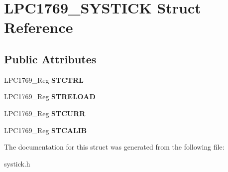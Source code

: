 \hypertarget{struct_l_p_c1769___s_y_s_t_i_c_k}{\section{L\+P\+C1769\+\_\+\+S\+Y\+S\+T\+I\+C\+K Struct Reference}
\label{struct_l_p_c1769___s_y_s_t_i_c_k}
}
\subsection*{Public Attributes}
\begin{DoxyCompactItemize}
\item 
\hypertarget{struct_l_p_c1769___s_y_s_t_i_c_k_ac19578163d340120906beb4732199f8c}{L\+P\+C1769\+\_\+\+Reg {\bfseries S\+T\+C\+T\+R\+L}}\label{struct_l_p_c1769___s_y_s_t_i_c_k_ac19578163d340120906beb4732199f8c}

\item 
\hypertarget{struct_l_p_c1769___s_y_s_t_i_c_k_a2f17969d3e20fb43ea3106ab9692cec7}{L\+P\+C1769\+\_\+\+Reg {\bfseries S\+T\+R\+E\+L\+O\+A\+D}}\label{struct_l_p_c1769___s_y_s_t_i_c_k_a2f17969d3e20fb43ea3106ab9692cec7}

\item 
\hypertarget{struct_l_p_c1769___s_y_s_t_i_c_k_a636459c239e7f4177e2c243c01941732}{L\+P\+C1769\+\_\+\+Reg {\bfseries S\+T\+C\+U\+R\+R}}\label{struct_l_p_c1769___s_y_s_t_i_c_k_a636459c239e7f4177e2c243c01941732}

\item 
\hypertarget{struct_l_p_c1769___s_y_s_t_i_c_k_a09f56937b894b0b4204868bd0b3502d9}{L\+P\+C1769\+\_\+\+Reg {\bfseries S\+T\+C\+A\+L\+I\+B}}\label{struct_l_p_c1769___s_y_s_t_i_c_k_a09f56937b894b0b4204868bd0b3502d9}

\end{DoxyCompactItemize}


The documentation for this struct was generated from the following file\+:\begin{DoxyCompactItemize}
\item 
systick.\+h\end{DoxyCompactItemize}

